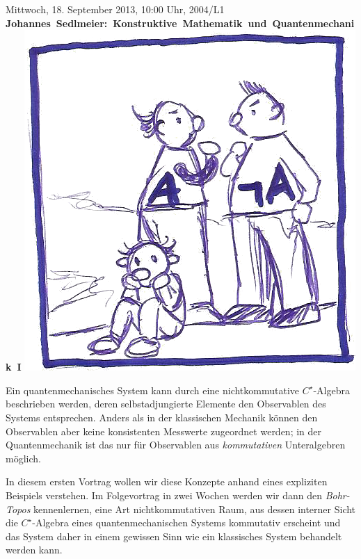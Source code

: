 \documentclass[a4paper,ngerman,landscape]{scrartcl}
\begin{document}
\begin{center}
  \huge
  Mittwoch, 18. September 2013, 10:00 Uhr, 2004/L1 \\
  \mbox{\textbf{Johannes Sedlmeier: Konstruktive Mathematik und Quantenmechanik I}}
  \vfill
  \includegraphics[scale=1.4]{lem}
  \vfill

  \Large
  \begin{minipage}{0.94\textwidth}
    \setlength\parskip{\medskipamount}
    Ein quantenmechanisches System kann durch eine nichtkommutative
    $C^\star$-Algebra beschrieben werden, \mbox{deren} selbstadjungierte Elemente den
    Observablen des Systems entsprechen. Anders als in der klassischen Mechanik
    können den Observablen aber keine konsistenten Messwerte zugeordnet werden;
    in der Quantenmechanik ist das nur für Observablen aus \emph{kommutativen}
    Unteralgebren möglich.

    In diesem ersten Vortrag wollen wir diese Konzepte anhand eines expliziten
    Beispiels verstehen. Im Folgevortrag in zwei Wochen werden wir dann den
    \emph{Bohr-Topos} kennenlernen, eine Art nichtkommutativen Raum, aus dessen
    interner Sicht die $C^\star$-Algebra eines quantenmechanischen Systems
    kommutativ erscheint und das System daher in einem gewissen Sinn wie ein
    klassisches System behandelt werden kann.
  \end{minipage}
\end{center}
\end{document}

